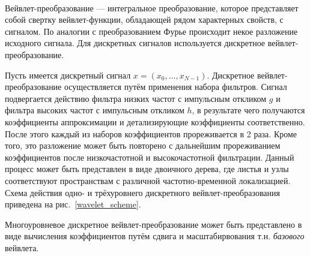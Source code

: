 \documentclass[12pt,a4paper,oneside,fleqn,leqno]{article}
\newcounter{pe} %
\newcommand*{\Nep}{\addtocounter{pe}{1}{\arabic{pe}$^{\circ}$.\;}}
\newcommand*{\NepS}{\mbox{} \\ \Nep}
\begin{document}
	\NepS {\bf Вейвлет-преобразование}
	\par Вейвлет-преобразование — интегральное преобразование, которое представляет собой свертку вейвлет-функции, обладающей рядом характерных свойств, с сигналом. По аналогии с преобразованием Фурье происходит некое разложение исходного сигнала. Для дискретных сигналов используется дискретное вейвлет-преобразование.
	\par Пусть имеется дискретный сигнал $x = (x_0, \dots, x_{N-1})$. Дискретное вейвлет-преобразование осуществляется путём применения набора фильтров. Сигнал подвергается действию фильтра низких частот с импульсным откликом $g$ и фильтра высоких частот с импульсным откликом $h$, в результате чего получаются коэффициенты аппроксимации и детализирующие коэффициенты соответственно. После этого каждый из наборов коэффициентов прореживается в 2 раза. Кроме того, это разложение может быть повторено с дальнейшим прореживанием коэффициентов после низкочастотной и высокочастотной фильтрации. Данный процесс может быть представлен в виде двоичного дерева, где листья и узлы соответствуют пространствам с различной частотно-временной локализацией. Схема действия одно- и трёхуровнего дискретного вейвлет-преобразования приведена на рис.~\ref{wavelet_scheme}.
	\par Многоуровневое дискретное вейвлет-преобразование может быть представлено в виде вычисления коэффициентов путём сдвига и масштабирвования т.н. {\it базового} вейвлета.
\end{document}
